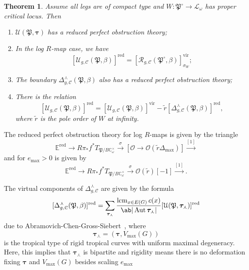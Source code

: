 \documentclass[10pt]{amsart}
\newtheorem{thm}{Theorem}[section]
\theoremstyle{definition}
\theoremstyle{remark}
\theoremstyle{plain}
\theoremstyle{definition}
\theoremstyle{remark}
\newcommand{\C}{\mathbb{C}}
\newcommand{\E}{\mathbb{E}}
\newcommand{\mc}[1]{\mathcal{#1}}
\newcommand{\mf}[1]{\mathfrak{#1}}
\newcommand{\btau}{\bm{\tau}}
\newcommand{\mr}[1]{\mathrm{#1}}
\newcommand{\on}[1]{\operatorname{#1}}
\newcommand{\1}{\mathbf{1}}
\newcommand{\2}{\mathbf{2}}
\newcommand{\3}{\mathbf{3}}
\newcommand{\vir}{\mr{vir}}
\DeclareMathOperator{\Aut}{Aut}
\begin{document}
\begin{thm}
    Assume all legs are of compact type and $W \colon \mf{P}^{\circ} \to \mc{L}_{\omega}$ has proper critical locus. Then
    \begin{enumerate}
        \item $\mc{U}(\mf{P},\btau)$ has a reduced perfect obstruction theory;
        \item In the log $R$-map case, we have
            \[ [\mc{U}_{g, \mc{C}}(\mf{P},\beta)]^{\on{red}} = [\mc{R}_{g,\mc{C}}(\mf{P}^{\circ}, \beta)]^{\vir}_{\sigma_W}; \]
        \item The boundary $\Delta_{g, \mc{C}}^{\curlywedge}(\mf{P}, \beta)$ also has a reduced perfect obstruction theory;
        \item There is the relation
            \[ [\mc{U}_{g, \mc{C}}(\mf{P}, \beta)]^{\on{red}} = [\mc{U}_{g, \mc{C}}(\mf{P}, \beta)]^{\vir} - \tilde{r} [\Delta^{\curlywedge}_{g, \mc{C}}(\mf{P}, \beta)]^{\on{red}}, \]
            where $\tilde{r}$ is the pole order of $W$ at infinity.
    \end{enumerate}
\end{thm}

The reduced perfect obstruction theory for log $R$-maps is given by the triangle
\[ \E^{\on{red}} \to R \pi_* f^* T_{\mf{P}/B\C_{\omega}^{\times}} \xrightarrow{\sigma} [\mc{O} \to \mc{O}(\tilde{r}\Delta_{\max})] \xrightarrow{[1]} \]
and for $e_{\max} > 0$ is given by
\[ \E^{\on{red}} \to R \pi_* f^* T_{\mf{P}/B\C_{\omega}^{\times}} \xrightarrow{\sigma} \mc{O}(\tilde{r})[-1] \xrightarrow{[1]}. \]

The virtual components of $\Delta_{g,\mc{C}}^{\curlywedge}$ are given by the formula
\[ [\Delta_{g, \mc{C}}^{\curlywedge}(\mf{P}, \beta)]^{\on{red}} = \sum_{\btau_{\curlywedge}} \frac{\on{lcm}_{x\in E(G)} c(x)}{\ab|\Aut \btau_{\curlywedge}|} [\mc{U}(\mf{P}, \btau_{\curlywedge})]^{\on{red}} \]
due to Abramovich-Chen-Gross-Siebert~\cite{puncturedlog}, where
\[ \btau_{\curlywedge} = (\btau, V_{\max}(G)) \]
is the tropical type of rigid tropical curves with uniform maximal degeneracy. Here, this implies that $\btau_{\curlywedge}$ is bipartite and rigidity means there is no deformation fixing $\btau$ and $V_{\max}(G)$ besides scaling $e_{\max}$
\end{document}
